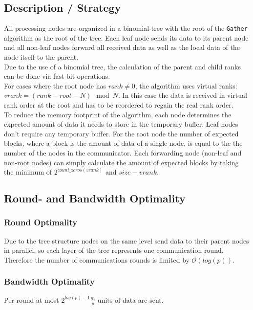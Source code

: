 \subsection{Description / Strategy}

All processing nodes are organized in a binomial-tree with the root of the \texttt{Gather} algorithm as the root of the tree. Each leaf node sends its data to its parent node and all non-leaf nodes forward all received data as well as the local data of the node itself to the parent. \\
Due to the use of a binomial tree, the calculation of the parent and child ranks can be done via fast bit-operations.\\

\noindent For cases where the root node has $rank \neq 0$, the algorithm uses virtual ranks:
$vrank = (rank - root - N ) \mod N$. In this case the data is received in virtual rank order at the root and has to be reordered to regain the real rank order.\\

\noindent To reduce the memory footprint of the algorithm, each node determines the expected amount of data it needs to store in the temporary buffer. Leaf nodes don't require any temporary buffer. For the root node the number of expected blocks, where a block is the amount of data of a single node, is equal to the the number of the nodes in the communicator. Each forwarding node (non-leaf and non-root nodes) can simply calculate the amount of expected blocks by taking the minimum of 
$2^{count\_zeros(vrank)}$ and $size - vrank$.

\subsection{Round- and Bandwidth Optimality}

\subsubsection{Round Optimality}
Due to the tree structure nodes on the same level send data to their parent nodes in parallel, so each layer of the tree represents one communication round. Therefore the number of communications rounds is limited by $\mathcal{O}(log(p))$.

\subsubsection{Bandwidth Optimality}
Per round at most $2^{log(p)-1} \frac{m}{p}$ units of data are sent. %

